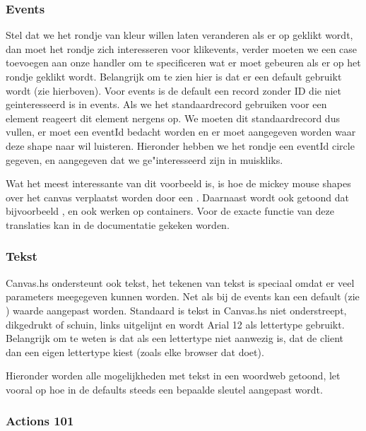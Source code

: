 \subsubsection{Events}
Stel dat we het rondje van kleur willen laten veranderen als er op geklikt wordt, dan moet het rondje zich interesseren voor klikevents, verder moeten we een case toevoegen aan onze handler om te specificeren wat er moet gebeuren als er op het rondje geklikt wordt. Belangrijk om te zien hier is dat er een default gebruikt wordt (zie hierboven). Voor events is de default een record zonder ID die niet geinteresseerd is in events. Als we het standaardrecord gebruiken voor een element reageert dit element nergens op. We moeten dit standaardrecord dus vullen, er moet een eventId bedacht worden en er moet aangegeven worden waar deze shape naar wil luisteren. Hieronder hebben we het rondje een eventId circle gegeven, en aangegeven dat we ge"interesseerd zijn in muiskliks.



Wat het meest interessante van dit voorbeeld is, is hoe de mickey mouse shapes over het canvas verplaatst worden door een . Daarnaast wordt ook getoond dat bijvoorbeeld ,  en  ook werken op containers. Voor de exacte functie van deze translaties kan in de documentatie gekeken worden. 

\subsubsection{Tekst}

Canvas.hs ondersteunt ook tekst, het tekenen van tekst is speciaal omdat er veel parameters meegegeven kunnen worden. Net als bij de events kan een default (zie ) waarde aangepast worden. Standaard is tekst in Canvas.hs niet onderstreept, dikgedrukt of schuin, links uitgelijnt en wordt Arial 12 als lettertype gebruikt. Belangrijk om te weten is dat als een lettertype niet aanwezig is, dat de client dan een eigen lettertype kiest (zoals elke browser dat doet).

Hieronder worden alle mogelijkheden met tekst in een woordweb getoond, let vooral op hoe in de defaults steeds een bepaalde sleutel aangepast wordt.


\subsubsection{Actions 101}

